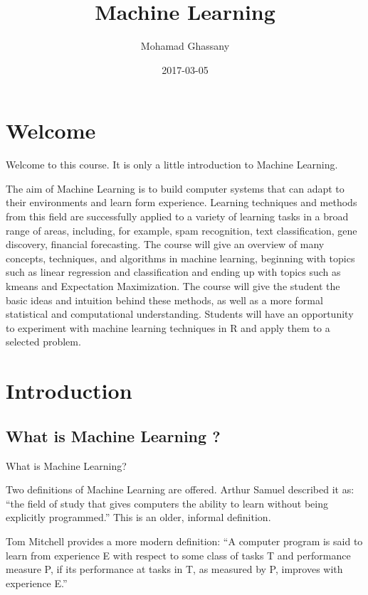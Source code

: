 \documentclass[]{book}
\title{Machine Learning}
\author{Mohamad Ghassany}
\date{2017-03-05}
\begin{document}
\maketitle

{
\setcounter{tocdepth}{2}
\tableofcontents
}
\chapter*{Welcome}\label{welcome}

Welcome to this course. It is only a little introduction to Machine
Learning.

The aim of Machine Learning is to build computer systems that can adapt
to their environments and learn form experience. Learning techniques and
methods from this field are successfully applied to a variety of
learning tasks in a broad range of areas, including, for example, spam
recognition, text classification, gene discovery, financial forecasting.
The course will give an overview of many concepts, techniques, and
algorithms in machine learning, beginning with topics such as linear
regression and classification and ending up with topics such as kmeans
and Expectation Maximization. The course will give the student the basic
ideas and intuition behind these methods, as well as a more formal
statistical and computational understanding. Students will have an
opportunity to experiment with machine learning techniques in R and
apply them to a selected problem.

\chapter*{Introduction}\label{introduction}

\section*{What is Machine Learning ?}\label{what-is-machine-learning}

What is Machine Learning?

Two definitions of Machine Learning are offered. Arthur Samuel described
it as: ``the field of study that gives computers the ability to learn
without being explicitly programmed.'' This is an older, informal
definition.

Tom Mitchell provides a more modern definition: ``A computer program is
said to learn from experience E with respect to some class of tasks T
and performance measure P, if its performance at tasks in T, as measured
by P, improves with experience E.''
\end{document}
